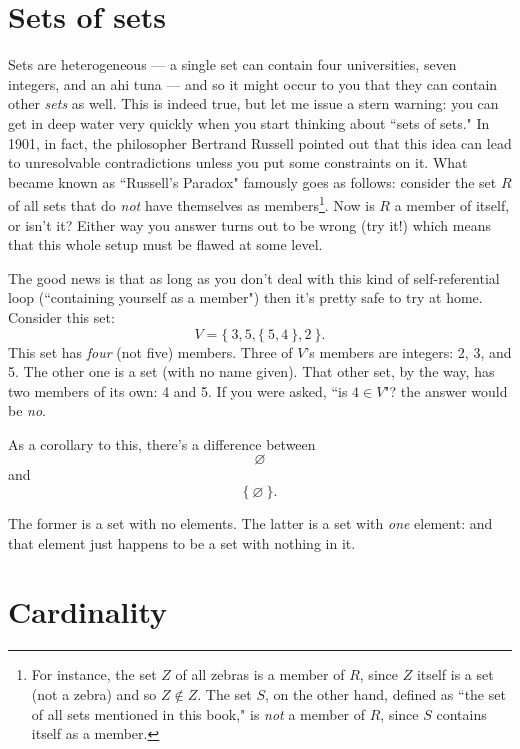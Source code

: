 \section{Sets of sets}

Sets are heterogeneous  --- a single set can contain four
universities, seven integers, and an ahi tuna --- and so it might occur to you
that they can contain other \textit{sets} as well. This is indeed true, but
let me issue a stern warning: you can get in deep water very quickly when you
start thinking about ``sets of sets."  In 1901, in fact,
the philosopher Bertrand Russell pointed out that this idea can lead to
unresolvable contradictions unless you put some constraints on it. What became
known as ``Russell's Paradox"  famously goes as
follows: consider the set $R$ of all sets that do \textit{not} have themselves
as members\footnote{For instance, the set $Z$ of all zebras is a member of
$R$, since $Z$ itself is a set (not a zebra) and so $Z \notin Z$. The set $S$,
on the other hand, defined as ``the set of all sets mentioned in this book,"
is \textit{not} a member of $R$, since $S$ contains itself as a member.}. Now
is $R$ a member of itself, or isn't it? Either way you answer turns out to be
wrong (try it!) which means that this whole setup must be flawed at some
level.

The good news is that as long as you don't deal with this kind of
self-referential loop (``containing yourself as a member") then it's pretty
safe to try at home. Consider this set:
\[
V = \{~3, 5, \{~5, 4~\}, 2~\}.
\]
This set has \textit{four} (not five) members. Three of $V$'s members are
integers: 2, 3, and 5. The other one is a set (with no name given). That
other set, by the way, has two members of its own: 4 and 5. If you were
asked, ``is $4 \in V$"? the answer would be \textit{no}.

As a corollary to this, there's a difference between 
\[
\varnothing
\]
and
\[
\{~\varnothing~\}.
\]

The former is a set with no elements. The latter is a set with \textit{one}
element: and that element just happens to be a set with nothing in it.


\section{Cardinality}


